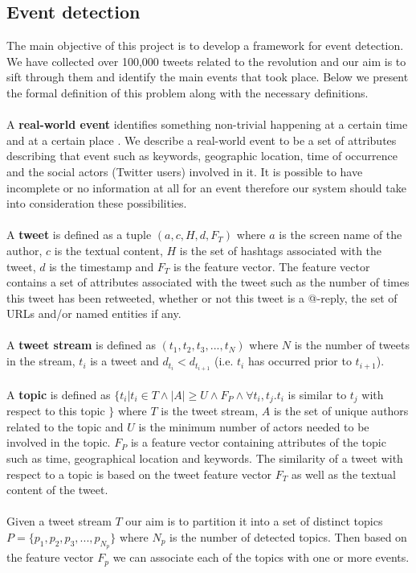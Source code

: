 \subsection{Event detection }\label{sec:EventDetection}
The main objective of this project is to develop a framework for event detection. We have collected over 100,000 tweets related to the revolution and our aim is to sift through them and identify the main events that took place. Below we present the formal definition of this problem along with the necessary definitions.\\\\
A \textbf{real-world event} identifies something non-trivial happening at a certain time and at a certain place \citep{Yang99learningapproaches}. We describe a real-world event to be a set of attributes describing that event such as keywords, geographic location, time of occurrence and the social actors (Twitter users) involved in it. It is possible to have incomplete or no information at all for an event therefore our system should take into consideration these possibilities.\\\\
A \textbf{tweet} is defined as a tuple $(a, c, H, d, F_T)$ where \boldmath  $a$ \unboldmath is the screen name of the author, \boldmath $c$  \unboldmath is the textual content, $H$ is the set of hashtags associated with the tweet, \boldmath $d$ \unboldmath is the timestamp and $F_T$ is the feature vector.  The feature vector contains a set of attributes associated with the tweet such as the number of times this tweet has been retweeted, whether or not this tweet is a @-reply, the set of URLs and/or named entities if any.\\\\
A \textbf{tweet stream} is defined as $(t_1, t_2, t_3,..., t_N)$ where $N$ is the number of tweets in the stream, $t_i$ is a tweet and $d_{t_i} < d_{t_{i+1}}$ (i.e. $t_i$ has occurred prior to $t_{i+1}$).\\\\
A \textbf{topic} is defined as $ \{t_i | t_i \in T \wedge |A| \geq U \wedge F_P \wedge \forall t_i, t_j. t_i$ is similar to $t_j$ with respect to this topic $\}$ where $T$ is the tweet stream, $A$ is the set of unique authors related to the topic and $U$ is the minimum number of actors needed to be involved in the topic. $F_P$ is a feature vector containing attributes of the topic such as time, geographical location and keywords. The similarity of a tweet with respect to a topic is based on the tweet feature vector $F_T$ as well as the textual content of the tweet.\\\\
Given a tweet stream $T$ our aim is to partition it into a set of distinct topics $P = \{p_1, p_2, p_3,..., p_{N_p}\}$ where $N_p$ is the number of detected topics. Then based on the feature vector $F_p$ we can associate each of the topics with one or more events.   

